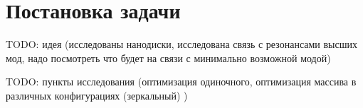\chapter{Постановка задачи}

TODO: идея (исследованы нанодиски, исследована связь с резонансами высших мод, надо посмотреть что будет на связи с минимально возможной модой)

TODO: пункты исследования (оптимизация одиночного, оптимизация массива в различных конфигурациях (зеркальный) )